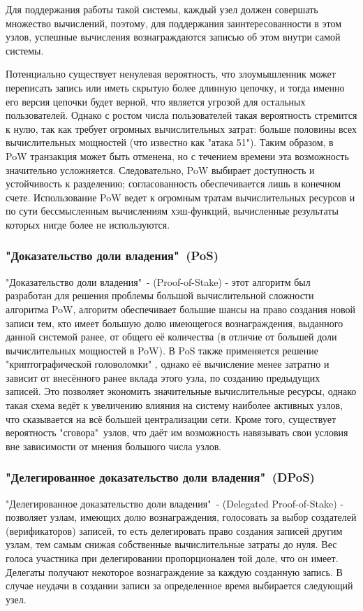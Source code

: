 \documentclass[subf, href, colorlinks=true, 14pt,
times, mtpro, specialist]{disser}
\theoremstyle{definition}
\begin{document}
Для поддержания работы такой системы, каждый узел должен совершать множество вычислений, поэтому, для поддержания заинтересованности в этом узлов, успешные вычисления вознаграждаются записью об этом внутри самой системы.

Потенциально существует ненулевая вероятность, что злоумышленник может переписать запись или иметь скрытую более длинную цепочку, и тогда именно его версия цепочки будет верной, что является угрозой для остальных пользователей. Однако с ростом числа пользователей такая вероятность стремится к нулю, так как требует огромных вычислительных затрат: больше половины всех вычислительных мощностей (что известно как "атака 51"). Таким образом, в PoW транзакция может быть отменена, но с течением времени эта возможность значительно усложняется. Следовательно, PoW выбирает доступность и устойчивость к разделению; согласованность обеспечивается лишь в конечном счете. Использование PoW ведет к огромным тратам вычислительных ресурсов и по сути бессмысленным вычислениям хэш-функций, вычисленные результаты которых нигде более не используются.

\subsubsection{"Доказательство доли владения"\ (PoS)}

"Доказательство доли владения"\ - (Proof-of-Stake) -  этот алгоритм был разработан для решения проблемы большой вычислительной сложности алгоритма PoW,  алгоритм обеспечивает большие шансы на право создания новой записи тем, кто имеет большую долю имеющегося вознаграждения, выданного данной системой ранее, от общего её количества (в отличие от большей доли вычислительных мощностей в PoW). В PoS также применяется решение "криптографической головоломки"{} , однако её вычисление менее затратно и зависит от внесённого ранее вклада этого узла, по созданию предыдущих записей. Это позволяет экономить значительные вычислительные ресурсы, однако такая схема ведёт к увеличению влияния на систему наиболее активных узлов, что сказывается на всё большей централизации сети. Кроме того, существует вероятность "сговора"\ узлов, что даёт им возможность навязывать свои условия вне зависимости от мнения большого числа узлов.

\subsubsection{"Делегированное доказательство доли владения"\ (DPoS)}
"Делегированное доказательство доли владения"\ - (Delegated Proof-of-Stake) - позволяет узлам, имеющих долю вознаграждения, голосовать за выбор создателей (верификаторов) записей, то есть делегировать право создания записей другим узлам, тем самым снижая собственные вычислительные затраты до нуля. Вес голоса участника при делегировании пропорционален той доле, что он имеет. Делегаты получают некоторое вознаграждение за каждую созданную запись.  В случае неудачи в создании записи за определенное время выбирается следующий узел.
\end{document}

